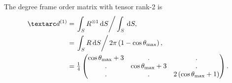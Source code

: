 
The  degree frame order matrix with tensor rank-2 is
\begin{subequations} \label{eq: iso cone, torsionless 1st degree frame order matrix}
\begin{align}
    \FOone &= \left. \int_S R^{\otimes 1} \diff S \right / \int_S \diff S , \\
           &= \left. \int_S R \diff S \right / 2\pi \left( 1 - \cos\conethetamax \right) , \\
           &= \quart \begin{pmatrix}
                  \cos\conethetamax + 3 & .                     & . \\
                  .                     & \cos\conethetamax + 3 & . \\
                  .                     & .                     & 2\left( \cos\conethetamax + 1 \right) \\
              \end{pmatrix} .
\end{align}
\end{subequations}



